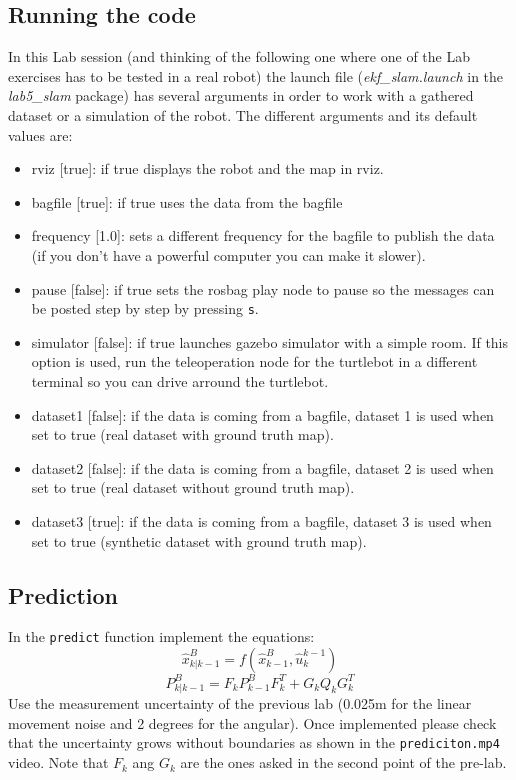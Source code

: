 \documentclass[a4paper,10pt]{article}
\begin{document}
\subsection{Running the code}
In this Lab session (and thinking of the following one where one of the Lab exercises has to be tested in a real robot) the launch file (\textit{ekf\_slam.launch} in the \textit{lab5\_slam} package) has several arguments in order to work with a gathered dataset or a simulation of the robot. The different arguments and its default values are:
\begin{itemize}
	\item rviz [true]: if true displays the robot and the map in rviz.
	\item bagfile [true]: if true uses the data from the bagfile
	\item frequency [1.0]: sets a different frequency for the bagfile to publish the data (if you don't have a powerful computer you can make it slower).
	\item pause [false]: if true sets the rosbag play node to pause so the messages can be posted step by step by pressing \texttt{s}.
	\item simulator [false]: if true launches gazebo simulator with a simple room. If this option is used, run the teleoperation node for the turtlebot in a different terminal so you can drive arround the turtlebot.
	\item dataset1 [false]: if the data is coming from a bagfile, dataset 1 is used when set to true (real dataset with ground truth map).
	\item dataset2 [false]: if the data is coming from a bagfile, dataset 2 is used when set to true (real dataset without ground truth map).
	\item dataset3 [true]: if the data is coming from a bagfile, dataset 3 is used when set to true (synthetic dataset with ground truth map).
\end{itemize} 

\subsection{Prediction}
In the \texttt{predict} function implement the equations:
\begin{equation}
	\widehat{x}_{k|k-1}^B = f\left(\widehat{x}_{k-1}^B,\widehat{u}_k^{k-1} \right)
\end{equation}
\begin{equation}
	P_{k|k-1}^B = F_k P_{k-1}^B F_k^T + G_k Q_k G_k^T
\end{equation}
Use the measurement uncertainty of the previous lab (0.025m for the linear movement noise and 2 degrees for the angular). Once implemented please check that the uncertainty grows without boundaries as shown in the \texttt{prediciton.mp4} video. Note that $F_k$ ang $G_k$ are the ones asked in the second point of the pre-lab.
\end{document}
